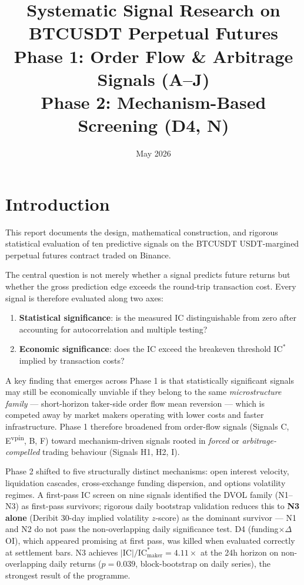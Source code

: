 \documentclass[12pt, a4paper]{article}
\title{\textbf{Systematic Signal Research on BTCUSDT Perpetual Futures}\\[0.4em]
\large Phase 1: Order Flow \& Arbitrage Signals (A--J)\\[0.2em]
\large Phase 2: Mechanism-Based Screening (D4, N)}
\author{}
\date{May 2026}
\theoremstyle{definition}
\newcommand{\IC}{\mathrm{IC}}
\begin{document}
\maketitle
\tableofcontents
\newpage

\section{Introduction}

This report documents the design, mathematical construction, and rigorous
statistical evaluation of ten predictive signals on the BTCUSDT USDT-margined
perpetual futures contract traded on Binance.

The central question is not merely whether a signal predicts future returns
but whether the gross prediction edge exceeds the round-trip transaction cost.
Every signal is therefore evaluated along two axes:
\begin{enumerate}
  \item \textbf{Statistical significance}: is the measured IC distinguishable
        from zero after accounting for autocorrelation and multiple testing?
  \item \textbf{Economic significance}: does the IC exceed the breakeven
        threshold $\IC^*$ implied by transaction costs?
\end{enumerate}

A key finding that emerges across Phase 1 is that statistically significant
signals may still be economically unviable if they belong to the same
\emph{microstructure family} — short-horizon taker-side order flow mean reversion —
which is competed away by market makers operating with lower costs and faster
infrastructure. Phase 1 therefore broadened from order-flow signals
(Signals C, E\textsuperscript{vpin}, B, F) toward mechanism-driven signals rooted
in \emph{forced} or \emph{arbitrage-compelled} trading behaviour (Signals H1, H2, I).

Phase 2 shifted to five structurally distinct mechanisms: open interest velocity,
liquidation cascades, cross-exchange funding dispersion, and options volatility
regimes. A first-pass IC screen on nine signals identified the DVOL family
(N1--N3) as first-pass survivors; rigorous daily bootstrap validation reduces
this to \textbf{N3 alone} (Deribit 30-day implied volatility $z$-score) as the
dominant survivor --- N1 and N2 do not pass the non-overlapping daily
significance test. D4 (funding$\times\Delta$OI), which appeared promising at
first pass, was killed when evaluated correctly at settlement bars. N3 achieves
$|\IC|/\IC^*_{\text{maker}} = 4.11\times$ at the 24h horizon on non-overlapping
daily returns ($p = 0.039$, block-bootstrap on daily series), the strongest
result of the programme.
\end{document}
